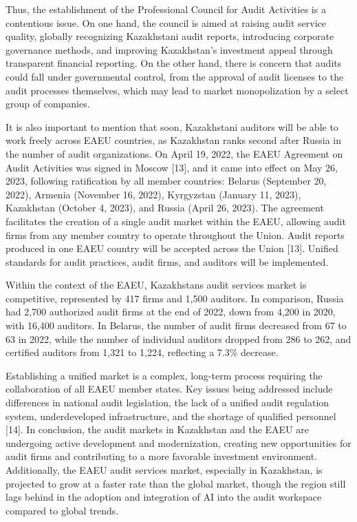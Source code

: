 \begin{multicols}{2}
Thus, the establishment of the Professional Council for Audit Activities
is a contentious issue. On one hand, the council is aimed at raising
audit service quality, globally recognizing Kazakhstani audit reports,
introducing corporate governance methods, and improving Kazakhstan's
investment appeal through transparent financial reporting. On the other
hand, there is concern that audits could fall under governmental
control, from the approval of audit licenses to the audit processes
themselves, which may lead to market monopolization by a select group of
companies.

It is also important to mention that soon, Kazakhstani auditors will be
able to work freely across EAEU countries, as Kazakhstan ranks second
after Russia in the number of audit organizations. On April 19, 2022,
the EAEU Agreement on Audit Activities was signed in Moscow {[}13{]},
and it came into effect on May 26, 2023, following ratification by all
member countries: Belarus (September 20, 2022), Armenia (November 16,
2022), Kyrgyzstan (January 11, 2023), Kazakhstan (October 4, 2023), and
Russia (April 26, 2023). The agreement facilitates the creation of a
single audit market within the EAEU, allowing audit firms from any
member country to operate throughout the Union. Audit reports produced
in one EAEU country will be accepted across the Union {[}13{]}. Unified
standards for audit practices, audit firms, and auditors will be
implemented.

Within the context of the EAEU, Kazakhstan\textquotesingle s audit
services market is competitive, represented by 417 firms and 1,500
auditors. In comparison, Russia had 2,700 authorized audit firms at the
end of 2022, down from 4,200 in 2020, with 16,400 auditors. In Belarus,
the number of audit firms decreased from 67 to 63 in 2022, while the
number of individual auditors dropped from 286 to 262, and certified
auditors from 1,321 to 1,224, reflecting a 7.3\% decrease.

Establishing a unified market is a complex, long-term process requiring
the collaboration of all EAEU member states. Key issues being addressed
include differences in national audit legislation, the lack of a unified
audit regulation system, underdeveloped infrastructure, and the shortage
of qualified personnel {[}14{]}. In conclusion, the audit markets in
Kazakhstan and the EAEU are undergoing active development and
modernization, creating new opportunities for audit firms and
contributing to a more favorable investment environment. Additionally,
the EAEU audit services market, especially in Kazakhstan, is projected
to grow at a faster rate than the global market, though the region still
lags behind in the adoption and integration of AI into the audit
workspace compared to global trends.


\end{multicols}
